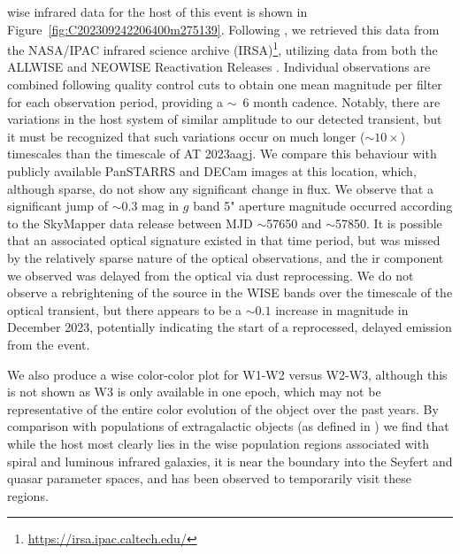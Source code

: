 \documentclass[twocolumn]{aastex631}
\begin{document}
\gls{wise} \citep{wrightWIDEFIELDINFRAREDSURVEY2010} infrared data for the host of this event is shown in Figure~\ref{fig:C202309242206400m275139}.
Following \citet{Clark2024}, we retrieved this data from the NASA/IPAC infrared science archive (IRSA)\footnote{\url{https://irsa.ipac.caltech.edu/}}, utilizing data from both the ALLWISE \citep{wright_2010_WIDEFIELDINFRAREDSURVEY} and NEOWISE Reactivation Releases \citep[NEOWISE-R;][]{mainzer_2011_NEOWISEOBSERVATIONSNEAREARTH, mainzer_2014_INITIALPERFORMANCENEOWISE}.
Individual observations are combined following quality control cuts to obtain one mean magnitude per filter for each observation period, providing a $\sim$~6 month cadence.
Notably, there are variations in the host system of similar amplitude to our detected transient, but it must be recognized that such variations occur on much longer ($\sim10\times$) timescales than the timescale of AT 2023aagj.
We compare this behaviour with publicly available PanSTARRS \citep{Flewelling_2020} and DECam images at this location, which, although sparse, do not show any significant change in flux. We observe that a significant jump of $\sim 0.3$ mag in $g$ band 5" aperture magnitude occurred according to the SkyMapper data release \citep{skymapper} between MJD $\sim$57650 and $\sim$57850. 
It is possible that an associated optical signature existed in that time period, but was %
missed by the relatively sparse nature of the optical observations, and the \gls{ir} component we observed was delayed from the optical via dust reprocessing.
We do not observe a rebrightening of the source in the WISE bands over the timescale of the optical transient, but there appears to be a $\sim 0.1$ increase in magnitude in December 2023, potentially indicating the start of a reprocessed, delayed emission from the event.

We also produce a \gls{wise} color-color plot for W1-W2 versus W2-W3, although this is not shown as W3 is only available in one epoch, which may not be representative of the entire color evolution of the object over the past years.
By comparison with populations of extragalactic objects (as defined in \citealt{wrightWIDEFIELDINFRAREDSURVEY2010}) we find that while the host most clearly lies in the \gls{wise} population regions associated with spiral and luminous infrared galaxies, it is near the boundary into the Seyfert and quasar parameter spaces, and %
has been observed to temporarily visit these regions.

\end{document}
